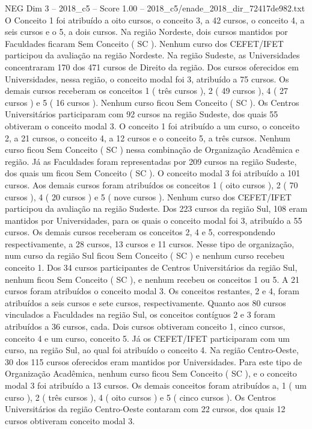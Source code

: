 \begin{textsample}{NEG Dim 3 – 2018\_c5 – Score 1.00 – 2018\_c5/enade\_2018\_dir\_72417de982.txt}
O Conceito 1 foi atribuído a oito cursos, o conceito 3, a 42 cursos, o conceito 4, a seis cursos e o 5, a dois cursos.
Na região Nordeste, dois cursos mantidos por Faculdades ficaram Sem Conceito ( SC ).
Nenhum curso dos CEFET/IFET participou da avaliação na região Nordeste.
Na região Sudeste, as Universidades concentraram 170 dos 471 cursos de Direito da região.
Dos cursos oferecidos em Universidades, nessa região, o conceito modal foi 3, atribuído a 75 cursos.
Os demais cursos receberam os conceitos 1 ( três cursos ), 2 ( 49 cursos ), 4 ( 27 cursos ) e 5 ( 16 cursos ).
Nenhum curso ficou Sem Conceito ( SC ).
Os Centros Universitários participaram com 92 cursos na região Sudeste, dos quais 55 obtiveram o conceito modal 3.
O conceito 1 foi atribuído a um curso, o conceito 2, a 21 cursos, o conceito 4, a 12 cursos e o conceito 5, a três cursos.
Nenhum curso ficou Sem Conceito ( SC ) nessa combinação de Organização Acadêmica e região.
Já as Faculdades foram representadas por 209 cursos na região Sudeste, dos quais um ficou Sem Conceito ( SC ).
O conceito modal 3 foi atribuído a 101 cursos.
Aos demais cursos foram atribuídos os conceitos 1 ( oito cursos ), 2 ( 70 cursos ), 4 ( 20 cursos ) e 5 ( nove cursos ).
Nenhum curso dos CEFET/IFET participou da avaliação na região Sudeste.
Dos 223 cursos da região Sul, 108 eram mantidos por Universidades, para os quais o conceito modal foi 3, atribuído a 55 cursos.
Os demais cursos receberam os conceitos 2, 4 e 5, correspondendo respectivamente, a 28 cursos, 13 cursos e 11 cursos.
Nesse tipo de organização, num curso da região Sul ficou Sem Conceito ( SC ) e nenhum curso recebeu conceito 1.
Dos 34 cursos participantes de Centros Universitários da região Sul, nenhum ficou Sem Conceito ( SC ), e nenhum recebeu os conceitos 1 ou 5.
A 21 cursos foram atribuídos o conceito modal 3.
Os conceitos restantes, 2 e 4, foram atribuídos a seis cursos e sete cursos, respectivamente.
Quanto aos 80 cursos vinculados a Faculdades na região Sul, os conceitos contíguos 2 e 3 foram atribuídos a 36 cursos, cada.
Dois cursos obtiveram conceito 1, cinco cursos, conceito 4 e um curso, conceito 5.
Já os CEFET/IFET participaram com um curso, na região Sul, ao qual foi atribuído o conceito 4.
Na região Centro-Oeste, 30 dos 115 cursos oferecidos eram mantidos por Universidades.
Para este tipo de Organização Acadêmica, nenhum curso ficou Sem Conceito ( SC ), e o conceito modal 3 foi atribuído a 13 cursos.
Os demais conceitos foram atribuídos a, 1 ( um curso ), 2 ( três cursos ), 4 ( oito cursos ) e 5 ( cinco cursos ).
Os Centros Universitários da região Centro-Oeste contaram com 22 cursos, dos quais 12 cursos obtiveram conceito modal 3.

\end{textsample}

